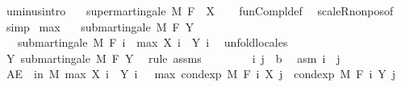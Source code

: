 \begin{isabellebody}
\endisatagproof
{\isafoldproof}%
%
\isadelimproof
\isanewline
%
\endisadelimproof
\isanewline
{}\isamarkupfalse%
\ uminus{\isacharbrackleft}{\kern0pt}intro{\isacharbrackright}{\kern0pt}{\isacharcolon}{\kern0pt}\isanewline
\ \ \ {\isachardoublequoteopen}supermartingale\ M\ F\ {\isacharparenleft}{\kern0pt}{\isacharminus}{\kern0pt}\ X{\isacharparenright}{\kern0pt}{\isachardoublequoteclose}\isanewline
%
\isadelimproof
\ \ %
\endisadelimproof
%
\isatagproof
{}\isamarkupfalse%
\ fun{\isacharunderscore}{\kern0pt}Compl{\isacharunderscore}{\kern0pt}def\ \isamarkupfalse%
\ scaleR{\isacharunderscore}{\kern0pt}nonpos{\isacharbrackleft}{\kern0pt}of\ {\isachardoublequoteopen}{\isacharminus}{\kern0pt}{}{\isachardoublequoteclose}{\isacharbrackright}{\kern0pt}\ \isamarkupfalse%
\ simp%
\endisatagproof
{\isafoldproof}%
%
\isadelimproof
\isanewline
%
\endisadelimproof
\isanewline
{}\isamarkupfalse%
\ max{\isacharcolon}{\kern0pt}\isanewline
\ \ \ {\isachardoublequoteopen}submartingale\ M\ F\ Y{\isachardoublequoteclose}\isanewline
\ \ \ {\isachardoublequoteopen}submartingale\ M\ F\ {\isacharparenleft}{\kern0pt}{\isasymlambda}i\ {\isasymxi}{\isachardot}{\kern0pt}\ max\ {\isacharparenleft}{\kern0pt}X\ i\ {\isasymxi}{\isacharparenright}{\kern0pt}\ {\isacharparenleft}{\kern0pt}Y\ i\ {\isasymxi}{\isacharparenright}{\kern0pt}{\isacharparenright}{\kern0pt}{\isachardoublequoteclose}\isanewline
%
\isadelimproof
%
\endisadelimproof
%
\isatagproof
{}\isamarkupfalse%
\ {\isacharparenleft}{\kern0pt}unfold{\isacharunderscore}{\kern0pt}locales{\isacharparenright}{\kern0pt}\isanewline
\ \ \isamarkupfalse%
\ Y{\isacharcolon}{\kern0pt}\ submartingale\ M\ F\ Y\ \isamarkupfalse%
\ {\isacharparenleft}{\kern0pt}rule\ assms{\isacharparenright}{\kern0pt}\isanewline
\ \ \isacommand{{\isacharbraceleft}{\kern0pt}}\isamarkupfalse%
\isanewline
\ \ \ \ \isamarkupfalse%
\ i\ j\ {\isacharcolon}{\kern0pt}{\isacharcolon}{\kern0pt}\ {\isacharprime}{\kern0pt}b\ \isamarkupfalse%
\ asm{\isacharcolon}{\kern0pt}\ {\isachardoublequoteopen}i\ {\isasymle}\ j{\isachardoublequoteclose}\isanewline
\ \ \ \ \isamarkupfalse%
\ {\isachardoublequoteopen}AE\ {\isasymxi}\ in\ M{\isachardot}{\kern0pt}\ max\ {\isacharparenleft}{\kern0pt}X\ i\ {\isasymxi}{\isacharparenright}{\kern0pt}\ {\isacharparenleft}{\kern0pt}Y\ i\ {\isasymxi}{\isacharparenright}{\kern0pt}\ {\isasymle}\ max\ {\isacharparenleft}{\kern0pt}cond{\isacharunderscore}{\kern0pt}exp\ M\ {\isacharparenleft}{\kern0pt}F\ i{\isacharparenright}{\kern0pt}\ {\isacharparenleft}{\kern0pt}X\ j{\isacharparenright}{\kern0pt}\ {\isasymxi}{\isacharparenright}{\kern0pt}\ {\isacharparenleft}{\kern0pt}cond{\isacharunderscore}{\kern0pt}exp\ M\ {\isacharparenleft}{\kern0pt}F\ i{\isacharparenright}{\kern0pt}\ {\isacharparenleft}{\kern0pt}Y\ j{\isacharparenright}{\kern0pt}\ {\isasymxi}{\isacharparenright}{\kern0pt}{\isachardoublequoteclose}\ \isamarkupfalse%

\end{isabellebody}
